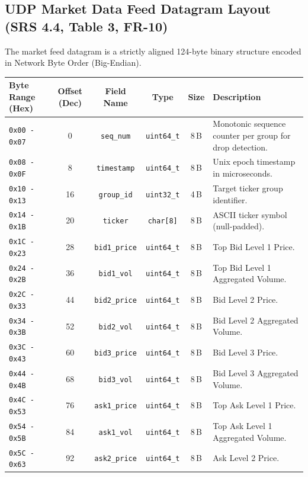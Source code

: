\documentclass[11pt,a4paper]{article}
\begin{document}
\subsection{UDP Market Data Feed Datagram Layout (SRS 4.4, Table 3, FR-10)}
The market feed datagram is a strictly aligned 124-byte binary structure encoded in Network Byte Order (Big-Endian).

\begin{table}[h!]
\centering
\small
\begin{tabularx}{\textwidth}{lccccX}
\toprule
\textbf{Byte Range (Hex)} & \textbf{Offset (Dec)} & \textbf{Field Name} & \textbf{Type} & \textbf{Size} & \textbf{Description} \\
\midrule
\texttt{0x00 - 0x07} & 0 & \texttt{seq\_num} & \texttt{uint64\_t} & 8\,B & Monotonic sequence counter per group for drop detection. \\
\texttt{0x08 - 0x0F} & 8 & \texttt{timestamp} & \texttt{uint64\_t} & 8\,B & Unix epoch timestamp in microseconds. \\
\texttt{0x10 - 0x13} & 16 & \texttt{group\_id} & \texttt{uint32\_t} & 4\,B & Target ticker group identifier. \\
\texttt{0x14 - 0x1B} & 20 & \texttt{ticker} & \texttt{char[8]} & 8\,B & ASCII ticker symbol (null-padded). \\
\texttt{0x1C - 0x23} & 28 & \texttt{bid1\_price} & \texttt{uint64\_t} & 8\,B & Top Bid Level 1 Price. \\
\texttt{0x24 - 0x2B} & 36 & \texttt{bid1\_vol} & \texttt{uint64\_t} & 8\,B & Top Bid Level 1 Aggregated Volume. \\
\texttt{0x2C - 0x33} & 44 & \texttt{bid2\_price} & \texttt{uint64\_t} & 8\,B & Bid Level 2 Price. \\
\texttt{0x34 - 0x3B} & 52 & \texttt{bid2\_vol} & \texttt{uint64\_t} & 8\,B & Bid Level 2 Aggregated Volume. \\
\texttt{0x3C - 0x43} & 60 & \texttt{bid3\_price} & \texttt{uint64\_t} & 8\,B & Bid Level 3 Price. \\
\texttt{0x44 - 0x4B} & 68 & \texttt{bid3\_vol} & \texttt{uint64\_t} & 8\,B & Bid Level 3 Aggregated Volume. \\
\texttt{0x4C - 0x53} & 76 & \texttt{ask1\_price} & \texttt{uint64\_t} & 8\,B & Top Ask Level 1 Price. \\
\texttt{0x54 - 0x5B} & 84 & \texttt{ask1\_vol} & \texttt{uint64\_t} & 8\,B & Top Ask Level 1 Aggregated Volume. \\
\texttt{0x5C - 0x63} & 92 & \texttt{ask2\_price} & \texttt{uint64\_t} & 8\,B & Ask Level 2 Price. \\

\end{tabularx}
\end{table}
\end{document}
